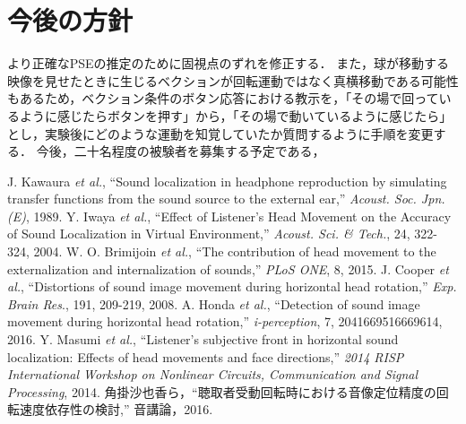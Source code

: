 \documentclass[12pt,a4j]{jsarticle}
\renewcommand{\ }{\hspace{1zw}}
\begin{document}
\section{今後の方針}
\ より正確なPSEの推定のために固視点のずれを修正する．
また，球が移動する映像を見せたときに生じるベクションが回転運動ではなく真横移動である可能性もあるため，ベクション条件のボタン応答における教示を，「その場で回っているように感じたらボタンを押す」から，「その場で動いているように感じたら」とし，実験後にどのような運動を知覚していたか質問するように手順を変更する．
今後，二十名程度の被験者を募集する予定である，

\begin{thebibliography}{1}
     J. Kawaura {\it et al.}, ``Sound localization in headphone reproduction by simulating transfer functions from the sound source to the external ear,'' {\it Acoust. Soc. Jpn.(E)}, 1989.
     Y. Iwaya {\it et al.}, ``Effect of Listener's Head Movement on the Accuracy of Sound Localization in Virtual Environment,'' {\it Acoust. Sci. \& Tech.}, 24, 322-324, 2004.
     W. O. Brimijoin {\it et al.}, ``The contribution of head movement to the externalization and internalization of sounds,'' {\it PLoS ONE}, 8, 2015.
     J. Cooper {\it et al.}, ``Distortions of sound image movement during horizontal head rotation,'' {\it Exp. Brain Res}., 191, 209-219, 2008.
     A. Honda {\it et al.}, ``Detection of sound image movement during horizontal head rotation,'' {\it i-perception}, 7, 2041669516669614, 2016.
     Y. Masumi {\it et al.}, ``Listener's subjective front in horizontal sound localization: Effects of head movements and face directions,'' {\it 2014 RISP International Workshop on Nonlinear Circuits, Communication and Signal Processing}, 2014.
     角掛沙也香ら，``聴取者受動回転時における音像定位精度の回転速度依存性の検討,'' 音講論，2016.
\end{thebibliography}
\end{document}
